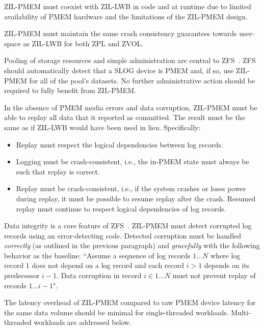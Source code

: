 \documentclass[12pt,a4paper,twoside]{book}
\begin{document}
ZIL-PMEM must coexist with ZIL-LWB in code and at runtime due to limited availability of PMEM hardware and the limitations of the ZIL-PMEM design.

ZIL-PMEM must maintain the same crash consistency guarantees towards user-space as ZIL-LWB for both ZPL and ZVOL.

Pooling of storage resources and simple administration are central to ZFS~\cite{bonwickZettabyteFileSystem2003}.
ZFS should automatically detect that a SLOG device is PMEM and, if so, use ZIL-PMEM for all of the pool’s datasets.
No further administrative action should be required to fully benefit from ZIL-PMEM.

In the absence of PMEM media errors and data corruption, ZIL-PMEM must be able to replay all data that it reported as committed.
The result must be the same as if ZIL-LWB would have been used in lieu.
Specifically:
\begin{itemize}[noitemsep,beginpenalty=100000,midpenalty=100000]
    \item Replay must respect the logical dependencies between log records.
    \item Logging must be crash-consistent, i.e., the in-PMEM state must always be such that replay is correct.
    \item Replay must be crash-consistent, i.e., if the system crashes or loses power during replay, it must be possible to resume replay after the crash.
        Resumed replay must continue to respect logical dependencies of log records.
\end{itemize}

Data integrity is a core feature of ZFS~\cite{bonwickZettabyteFileSystem2003}.
ZIL-PMEM must detect corrupted log records using an error-detecting code.
Detected corruption must be handled \textit{correctly} (as outlined in the previous paragraph) and \textit{gracefully} with the following behavior as the baseline:
``Assume a sequence of log records $1 \dots N$ where log record $1$ does not depend on a log record and each record $i > 1$ depends on its predecessor $i-1$.
Data corruption in record $i \in 1 \dots N$ must not prevent replay of records $1 \dots i-1$".

The latency overhead of ZIL-PMEM compared to raw PMEM device latency for the same data volume should be minimal for single-threaded workloads.
Multi-threaded workloads are addressed below.
\end{document}
